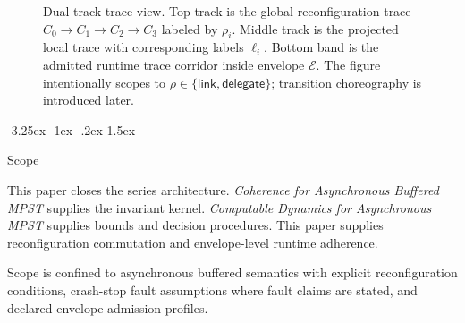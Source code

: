 \documentclass[a4paper,10pt,twocolumn,english]{article}
\makeatletter
\renewcommand{\subsection}{\@startsection{subsection}{2}{\z@}%
  {-3.25ex \@plus -1ex \@minus -.2ex}%
  {1.5ex}%
  {\raggedright\normalfont\normalsize\bfseries}}
\numberwithin{equation}{section}
\theoremstyle{paperdef}
\theoremstyle{paperplain}
\theoremstyle{paperdef}
\theoremstyle{paperremark}
\theoremstyle{paperdef}
\makeatother
\begin{document}
\begin{figure}[H]
	\caption{Dual-track trace view. Top track is the global reconfiguration trace
		$C_0 \to C_1 \to C_2 \to C_3$ labeled by $\rho_i$. Middle track is the
		projected local trace with corresponding labels $\ell_i$. Bottom band is the
		admitted runtime trace corridor inside envelope $\mathcal{E}$. The figure
		intentionally scopes to $\rho\in\{\mathsf{link},\mathsf{delegate}\}$; transition
		choreography is introduced later.}
	\label{fig:p3-layered-stack}
\end{figure}

\subsection{Scope}

This paper closes the series architecture. \emph{Coherence for Asynchronous Buffered MPST} supplies
the invariant kernel. \emph{Computable Dynamics for Asynchronous MPST} supplies bounds and decision
procedures. This paper supplies reconfiguration commutation and envelope-level runtime adherence.

Scope is confined to asynchronous buffered semantics with explicit reconfiguration conditions,
crash-stop fault assumptions where fault claims are stated, and declared envelope-admission profiles.
\end{document}
